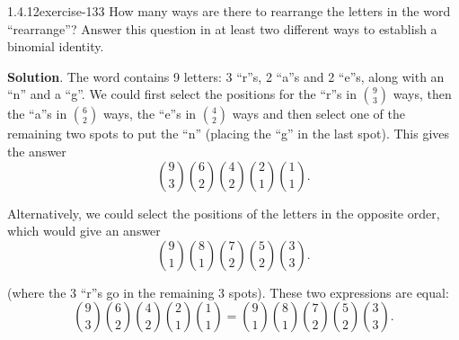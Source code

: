 \documentclass[twoside,11pt,]{book}
\numberwithin{equation}{chapter}
\begin{document}
\begin{divisionsolution}{1.4.12}{}{exercise-133}%
\hypertarget{p-2160}{}%
How many ways are there to rearrange the letters in the word ``rearrange''? Answer this question in at least two different ways to establish a binomial identity.%
\par\smallskip%
\noindent\textbf{Solution}.\quad%
\hypertarget{p-2161}{}%
The word contains 9 letters: 3 ``r''s, 2 ``a''s and 2 ``e''s, along with an ``n'' and a ``g''. We could first select the positions for the ``r''s in \({9 \choose 3}\) ways, then the ``a''s in \({6 \choose 2}\) ways, the ``e''s in \({4 \choose 2}\) ways and then select one of the remaining two spots to put the ``n'' (placing the ``g'' in the last spot). This gives the answer%
\begin{equation*}
{9 \choose 3}{6 \choose 2}{4 \choose 2}{2\choose 1}{1\choose 1}\text{.}
\end{equation*}
%
\par
\hypertarget{p-2162}{}%
Alternatively, we could select the positions of the letters in the opposite order, which would give an answer%
\begin{equation*}
{9 \choose 1}{8\choose 1}{7 \choose 2}{5\choose 2}{3\choose 3}\text{.}
\end{equation*}
%
\par
\hypertarget{p-2163}{}%
(where the 3 ``r''s go in the remaining 3 spots). These two expressions are equal:%
\begin{equation*}
{9 \choose 3}{6 \choose 2}{4 \choose 2}{2\choose 1}{1\choose 1} = {9 \choose 1}{8\choose 1}{7 \choose 2}{5\choose 2}{3\choose 3}\text{.}
\end{equation*}
%
\end{divisionsolution}%
\end{document}
